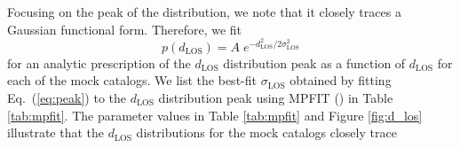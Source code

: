                                                                                                                                                             Focusing on the peak of the distribution, we note that it closely traces 
                                                                                                                                                            a Gaussian functional form. Therefore, we fit
                                                                                                                                                            \begin{equation} \label{eq:peak} 
                                                                                                                                                                p(d_{\mathrm{LOS}}) = A \; e^{-{d_{\mathrm{LOS}}^2}/{2\sigma_\mathrm{LOS}^2}}
                                                                                                                                                                \end{equation}
                                                                                                                                                                for an analytic prescription of the $d_{\mathrm{LOS}}$ distribution peak as a 
                                                                                                                                                                function of $d_\mathrm{LOS}$ for each of the mock catalogs. We list the 
                                                                                                                                                                best-fit $\sigma_\mathrm{LOS}$ obtained by fitting Eq.~(\ref{eq:peak}) to the 
                                                                                                                                                                $d_{\mathrm{LOS}}$ distribution peak using 
                                                                                                                                                                MPFIT (\citealt{Markwardt:2009aa}) in Table \ref{tab:mpfit}. The parameter values
                                                                                                                                                                in Table \ref{tab:mpfit} and Figure \ref{fig:d_los} illustrate that the 
                                                                                                                                                                $d_{\mathrm{LOS}}$ distributions for the mock catalogs closely trace 
